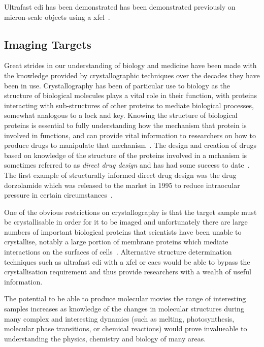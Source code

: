 Ultrafast \gls{cdi} has been demonstrated has been demonstrated previously on micron-scale objects using a \gls{xfel}~\cite{chapman_femtosecond_2006}.

\subsection{Imaging Targets}

Great strides in our understanding of biology and medicine have been made with the knowledge provided by crystallographic techniques over the decades they have been in use.
Crystallography has been of particular use to biology as the structure of biological molecules plays a vital role in their function, with proteins interacting with sub-structures of other proteins to mediate biological processes, somewhat analogous to a lock and key.
Knowing the structure of biological proteins is essential to fully understanding how the mechanism that protein is involved in functions, and can provide vital information to researchers on how to produce drugs to manipulate that mechanism~\cite{aloy_structural_2006,almen_mapping_2009}.
The design and creation of drugs based on knowledge of the structure of the proteins involved in a mchanism is sometimes referred to as \emph{direct drug design} and has had some success to date~\cite{klebe_recent_2000,jhoti_structure-based_2007,mauser_recent_2008}.
The first example of structurally informed direct drug design was the drug dorzolamide which was released to the market in 1995 to reduce intraocular pressure in certain circumstances~\cite{greer_application_1994}.

One of the obvious restrictions on crystallography is that the target sample must be crystallisable in order for it to be imaged and unfortunately there are large numbers of important biological proteins that scientists have been unable to crystallise, notably a large portion of membrane proteins which mediate interactions on the surfaces of cells~\cite{geerlof_impact_2006}.
Alternative structure determination techniques such as ultrafast \gls{cdi} with a \gls{xfel} or \gls{caes} would be able to bypass the crystallisation requirement and thus provide researchers with a wealth of useful information.

The potential to be able to produce molecular movies the range of interesting samples increases as knowledge of the changes in molecular structures during many complex and interesting dynamics (such as melting, photosynthesis, molecular phase transitions, or chemical reactions) would prove invalueable to understanding the physics, chemistry and biology of many areas.

